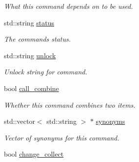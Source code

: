 \begin{DoxyCompactItemize}
\begin{DoxyCompactList}\small\item\em \-What this command depends on to be used. \end{DoxyCompactList}\item 
\hypertarget{class_item_command_a46091780df5b87f52db4e851deeb2aa1}{
std\-::string \hyperlink{class_item_command_a46091780df5b87f52db4e851deeb2aa1}{status}}
\label{class_item_command_a46091780df5b87f52db4e851deeb2aa1}

\begin{DoxyCompactList}\small\item\em \-The commands status. \end{DoxyCompactList}\item 
\hypertarget{class_item_command_ab48cc2be6ad392f61a4cc09d8ddaa061}{
std\-::string \hyperlink{class_item_command_ab48cc2be6ad392f61a4cc09d8ddaa061}{unlock}}
\label{class_item_command_ab48cc2be6ad392f61a4cc09d8ddaa061}

\begin{DoxyCompactList}\small\item\em \-Unlock string for command. \end{DoxyCompactList}\item 
\hypertarget{class_item_command_a980a5aea68b7ace0a401561f81fc484e}{
bool \hyperlink{class_item_command_a980a5aea68b7ace0a401561f81fc484e}{call\-\_\-combine}}
\label{class_item_command_a980a5aea68b7ace0a401561f81fc484e}

\begin{DoxyCompactList}\small\item\em \-Whether this command combines two items. \end{DoxyCompactList}\item 
\hypertarget{class_item_command_adc9ff7f20c2dec3f40bf5856d508cde2}{
std\-::vector$<$ std\-::string $>$ $\ast$ \hyperlink{class_item_command_adc9ff7f20c2dec3f40bf5856d508cde2}{synonyms}}
\label{class_item_command_adc9ff7f20c2dec3f40bf5856d508cde2}

\begin{DoxyCompactList}\small\item\em \-Vector of synonyms for this command. \end{DoxyCompactList}\item 
\hypertarget{class_item_command_a624650b662bbb506c74f943f40c9d9ea}{
bool \hyperlink{class_item_command_a624650b662bbb506c74f943f40c9d9ea}{change\-\_\-collect}}
\label{class_item_command_a624650b662bbb506c74f943f40c9d9ea}


\end{DoxyCompactItemize}
